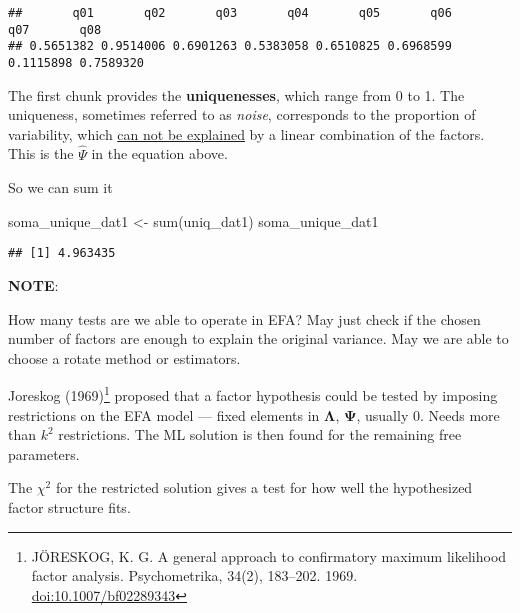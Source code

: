 \documentclass[
]{article}
\newenvironment{Shaded}{\begin{snugshade}}{\end{snugshade}}
\newcommand{\DecValTok}[1]{\textcolor[rgb]{0.00,0.00,0.81}{#1}}
\newcommand{\FunctionTok}[1]{\textcolor[rgb]{0.00,0.00,0.00}{#1}}
\newcommand{\NormalTok}[1]{#1}
\newcommand{\OtherTok}[1]{\textcolor[rgb]{0.56,0.35,0.01}{#1}}
\newcommand{\SpecialCharTok}[1]{\textcolor[rgb]{0.00,0.00,0.00}{#1}}
\begin{document}
\begin{Shaded}
\end{Shaded}

\begin{verbatim}
##       q01       q02       q03       q04       q05       q06       q07       q08 
## 0.5651382 0.9514006 0.6901263 0.5383058 0.6510825 0.6968599 0.1115898 0.7589320
\end{verbatim}

The first chunk provides the \textbf{uniquenesses}, which range from 0
to 1. The uniqueness, sometimes referred to as \emph{noise}, corresponds
to the proportion of variability, which \underline{can not be explained}
by a linear combination of the factors. This is the \(\hat{\Psi}\) in
the equation above.

So we can sum it

\begin{Shaded}
\begin{Highlighting}[]
\NormalTok{soma\_unique\_dat1 }\OtherTok{\textless{}{-}} \FunctionTok{sum}\NormalTok{(uniq\_dat1)}
\NormalTok{soma\_unique\_dat1}
\end{Highlighting}
\end{Shaded}

\begin{verbatim}
## [1] 4.963435
\end{verbatim}

\textbf{NOTE}:

How many tests are we able to operate in EFA? May just check if the
chosen number of factors are enough to explain the original variance.
May we are able to choose a rotate method or estimators.

Joreskog (1969)\footnote{JÖRESKOG, K. G. A general approach to
  confirmatory maximum likelihood factor analysis. Psychometrika, 34(2),
  183--202. 1969. \url{doi:10.1007/bf02289343}} proposed that a factor
hypothesis could be tested by imposing restrictions on the EFA model ---
fixed elements in \(\mathbf{\Lambda}\), \(\mathbf{\Psi}\), usually 0.
Needs more than \(k^2\) restrictions. The ML solution is then found for
the remaining free parameters.

The \(\chi^2\) for the restricted solution gives a test for how well the
hypothesized factor structure fits.
\end{document}
